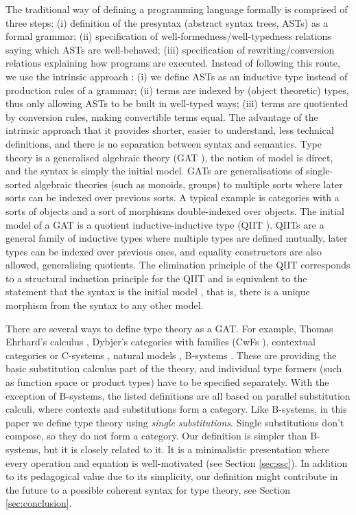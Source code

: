 \documentclass[sigplan,10pt,anonymous,review]{acmart}\settopmatter{printfolios=true,printccs=false,printacmref=false}
\begin{document}
The traditional way of defining a programming language formally
\cite{DBLP:books/cu/Ha2016,Pierce:SF2,plfa22.08} is comprised of three
steps: (i) definition of the presyntax (abstract syntax trees, ASTs)
as a formal grammar; (ii) specification of
well-formedness/well-typedness relations saying which ASTs are
well-behaved; (iii) specification of rewriting/conversion relations
explaining how programs are executed. Instead of following this route,
we use the intrinsic approach
\cite{DBLP:conf/csl/AltenkirchR99,DBLP:conf/popl/AltenkirchK16}: (i)
we define ASTs as an inductive type instead of production rules of a
grammar; (ii) terms are indexed by (object theoretic) types, thus only
allowing ASTs to be built in well-typed ways; (iii) terms are
quotiented by conversion rules, making convertible terms equal. The
advantage of the intrinsic approach that it provides shorter, easier
to understand, less technical definitions, and there is no separation
between syntax and semantics. Type theory is a generalised algebraic
theory (GAT \cite{DBLP:journals/apal/Cartmell86}), the notion of model
is direct, and the syntax is simply the initial model. GATs are
generalisations of single-sorted algebraic theories (such as monoids,
groups) to multiple sorts where later sorts can be indexed over
previous sorts. A typical example is categories with a sorts of
objects and a sort of morphisms double-indexed over objects. The
initial model of a GAT is a quotient inductive-inductive type (QIIT
\cite{DBLP:journals/pacmpl/KaposiKA19}). QIITs are a general family of
inductive types where multiple types are defined mutually, later types
can be indexed over previous ones, and equality constructors are also
allowed, generalising quotients. The elimination principle of the QIIT
corresponds to a structural induction principle for the QIIT and is
equivalent to the statement that the syntax is the initial model
\cite{DBLP:journals/pacmpl/KaposiKA19}, that is, there is a unique
morphism from the syntax to any other model.

There are several ways to define type theory as a GAT. For example,
Thomas Ehrhard's calculus \cite{ehrhard,coquandEhrhard}, Dybjer's
categories with families (CwFs
\cite{DBLP:conf/types/Dybjer95,Castellan2021}), contextual categories
or C-systems
\cite{DBLP:journals/apal/Cartmell86,DBLP:journals/lmcs/AhrensLV18},
natural models \cite{DBLP:journals/mscs/Awodey18}, B-systems
\cite{AHRENS_EMMENEGGER_NORTH_RIJKE_2023}. These are providing the
basic substitution calculus part of the theory, and individual type
formers (such as function space or product types) have to be specified
separately. With the exception of B-systems, the listed definitions
are all based on parallel substitution calculi, where contexts and
substitutions form a category. Like B-systems, in this paper we define
type theory using \emph{single substitutions}. Single substitutions
don't compose, so they do not form a category. Our definition is
simpler than B-systems, but it is closely related to it. It is a
minimalistic presentation where every operation and equation is
well-motivated (see Section \ref{sec:ssc}). In addition to its
pedagogical value due to its simplicity, our definition might
contribute in the future to a possible coherent syntax for type
theory, see Section \ref{sec:conclusion}.
\end{document}
